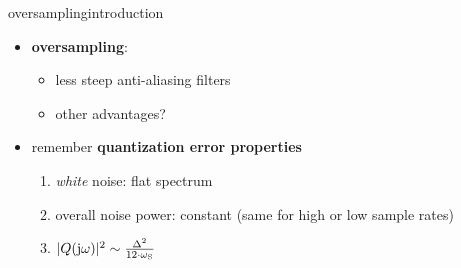 	\begin{frame}{oversampling}{introduction}
		\begin{itemize}
            \item   \textbf{oversampling}: 
            \begin{itemize}
                \item<2->[$\Rightarrow$]	less steep anti-aliasing filters
                \item<2->[$\Rightarrow$]	other advantages?
            \end{itemize}

            \bigskip
			\item<3->	remember \textbf{quantization error properties}
			\begin{enumerate}
				\item	\textit{white} noise: flat spectrum
				\item	overall noise power: constant (same for high or low sample rates)
                \bigskip
                \item<4->[$\Rightarrow$] $|Q(\mathrm{j}\omega)|^2 \sim \frac{\Delta^2}{12\cdot \omega_\mathrm{S}}$
			\end{enumerate}
		\end{itemize}
        
        \bigskip
	\end{frame}	
    
